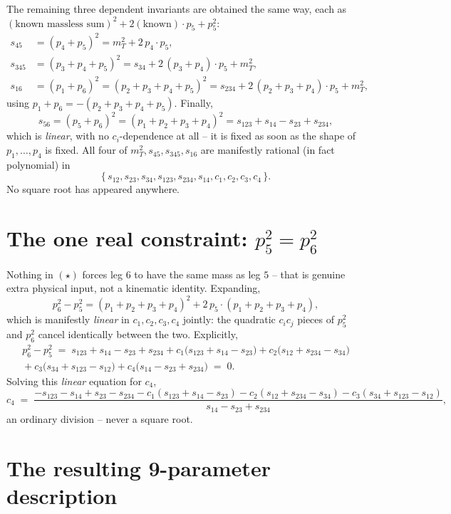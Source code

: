 \documentclass[11pt]{article}
\begin{document}
The remaining three dependent invariants are obtained the same way, each as $(\text{known massless sum})^2+2(\text{known})\!\cdot\! p_5+p_5^2$:
\begin{align}
  s_{45} &= (p_4+p_5)^2 = m_T^2 + 2\,p_4\!\cdot\! p_5, \\
  s_{345} &= (p_3+p_4+p_5)^2 = s_{34} + 2\,(p_3+p_4)\!\cdot\! p_5 + m_T^2, \\
  s_{16} &= (p_1+p_6)^2 = (p_2+p_3+p_4+p_5)^2 = s_{234} + 2\,(p_2+p_3+p_4)\!\cdot\! p_5 + m_T^2,
\end{align}
using $p_1+p_6=-(p_2+p_3+p_4+p_5)$. Finally,
\[
  s_{56} = (p_5+p_6)^2 = (p_1+p_2+p_3+p_4)^2 = s_{123}+s_{14}-s_{23}+s_{234},
\]
which is \emph{linear}, with no $c_i$-dependence at all -- it is fixed as soon as the shape of $p_1,\dots,p_4$ is fixed. All four of $m_T^2,s_{45},s_{345},s_{16}$ are manifestly rational (in fact polynomial) in
\[
  \{\,s_{12},s_{23},s_{34},s_{123},s_{234},s_{14},c_1,c_2,c_3,c_4\,\}.
\]
No square root has appeared anywhere.

\section{The one real constraint: $p_5^2=p_6^2$}

Nothing in $(\star)$ forces leg $6$ to have the same mass as leg $5$ -- that is genuine extra physical input, not a kinematic identity. Expanding,
\[
  p_6^2-p_5^2 = (p_1+p_2+p_3+p_4)^2 + 2\,p_5\!\cdot\!(p_1+p_2+p_3+p_4),
\]
which is manifestly \emph{linear} in $c_1,c_2,c_3,c_4$ jointly: the quadratic $c_ic_j$ pieces of $p_5^2$ and $p_6^2$ cancel identically between the two. Explicitly,
\begin{multline*}
  p_6^2-p_5^2 \;=\; s_{123}+s_{14}-s_{23}+s_{234}
  + c_1\big(s_{123}+s_{14}-s_{23}\big) + c_2\big(s_{12}+s_{234}-s_{34}\big)\\
  {}+ c_3\big(s_{34}+s_{123}-s_{12}\big) + c_4\big(s_{14}-s_{23}+s_{234}\big) \;=\;0.
\end{multline*}
Solving this \emph{linear} equation for $c_4$,
\[
  c_4 \;=\; \frac{-s_{123}-s_{14}+s_{23}-s_{234}
  -c_1(s_{123}+s_{14}-s_{23})-c_2(s_{12}+s_{234}-s_{34})-c_3(s_{34}+s_{123}-s_{12})}
  {s_{14}-s_{23}+s_{234}},
\]
an ordinary division -- never a square root.

\section{The resulting 9-parameter description}
\end{document}

